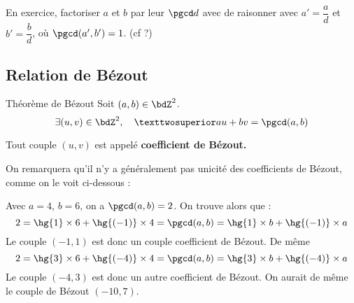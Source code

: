 \documentclass[a4paper,french,bookmarks]{article}
\begin{document}
\begin{exercise}{}{}
    En exercice, factoriser $a$ et $b$ par leur $\pgcd d$ avec de raisonner avec $a' = \dfrac{a}{d}$ et $b' = \dfrac{b}{d}$, où $\pgcd(a', b') = 1$. (cf ?) 
\end{exercise}

\subsection{Relation de Bézout}

\begin{theorem}{Théorème de Bézout}{}
    Soit $(a, b) \in \bdZ^2$.
    \[ \exists (u, v) \in \bdZ^2,\quad² au + bv = \pgcd(a, b)\]
    
    Tout couple $(u, v)$ est appelé \bf{coefficient de Bézout}.
\end{theorem}


On remarquera qu'il n'y a généralement pas unicité des coefficients de Bézout, comme on le voit ci-dessous :
\begin{example}{}{}
    Avec $a = 4$, $b = 6$, on a $\pgcd(a, b) = 2$. On trouve alors que :
    \[ 2 = \hg{1} \times 6 + \hg{(-1)} \times 4 = \pgcd(a, b) = \hg{1} \times b + \hg{(-1)} \times a \]
    Le couple $(-1, 1)$ est donc un couple coefficient de Bézout. De même
    \[ 2 = \hg{3} \times 6 + \hg{(-4)} \times 4 = \pgcd(a, b) = \hg{3} \times b + \hg{(-4)} \times a \]
    Le couple $(-4, 3)$ est donc un autre coefficient de Bézout. On aurait de même le couple de Bézout $(-10, 7)$.
\end{example}
\end{document}
